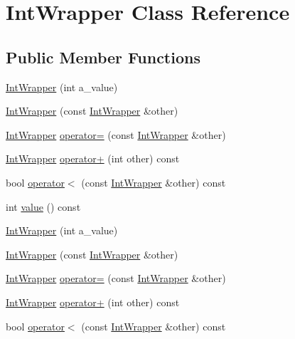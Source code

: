 \hypertarget{class_int_wrapper}{}\section{Int\+Wrapper Class Reference}
\label{class_int_wrapper}
\subsection*{Public Member Functions}
\begin{DoxyCompactItemize}
\item 
\mbox{\hyperlink{class_int_wrapper_a1d35e0d0b9c0fc109a8d2a2118ae6010}{Int\+Wrapper}} (int a\+\_\+value)
\item 
\mbox{\hyperlink{class_int_wrapper_af23efe3c8d8bf176948922b41e8f253e}{Int\+Wrapper}} (const \mbox{\hyperlink{class_int_wrapper}{Int\+Wrapper}} \&other)
\item 
\mbox{\hyperlink{class_int_wrapper}{Int\+Wrapper}} \mbox{\hyperlink{class_int_wrapper_a39077b3c0eb1dd8a296a81bfb0a047b3}{operator=}} (const \mbox{\hyperlink{class_int_wrapper}{Int\+Wrapper}} \&other)
\item 
\mbox{\hyperlink{class_int_wrapper}{Int\+Wrapper}} \mbox{\hyperlink{class_int_wrapper_abf97bd11dd2825f3cb9e4d9f48152b56}{operator+}} (int other) const
\item 
bool \mbox{\hyperlink{class_int_wrapper_a940fd2978cdf7849281f11b32df94163}{operator$<$}} (const \mbox{\hyperlink{class_int_wrapper}{Int\+Wrapper}} \&other) const
\item 
int \mbox{\hyperlink{class_int_wrapper_a6103e9dc5eb94678985e3c2ac481b508}{value}} () const
\item 
\mbox{\hyperlink{class_int_wrapper_a1d35e0d0b9c0fc109a8d2a2118ae6010}{Int\+Wrapper}} (int a\+\_\+value)
\item 
\mbox{\hyperlink{class_int_wrapper_af23efe3c8d8bf176948922b41e8f253e}{Int\+Wrapper}} (const \mbox{\hyperlink{class_int_wrapper}{Int\+Wrapper}} \&other)
\item 
\mbox{\hyperlink{class_int_wrapper}{Int\+Wrapper}} \mbox{\hyperlink{class_int_wrapper_a39077b3c0eb1dd8a296a81bfb0a047b3}{operator=}} (const \mbox{\hyperlink{class_int_wrapper}{Int\+Wrapper}} \&other)
\item 
\mbox{\hyperlink{class_int_wrapper}{Int\+Wrapper}} \mbox{\hyperlink{class_int_wrapper_abf97bd11dd2825f3cb9e4d9f48152b56}{operator+}} (int other) const
\item 
bool \mbox{\hyperlink{class_int_wrapper_a940fd2978cdf7849281f11b32df94163}{operator$<$}} (const \mbox{\hyperlink{class_int_wrapper}{Int\+Wrapper}} \&other) const

\end{DoxyCompactItemize}
